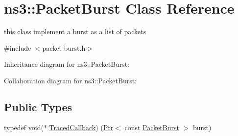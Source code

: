 \hypertarget{classns3_1_1PacketBurst}{}\section{ns3\+:\+:Packet\+Burst Class Reference}
\label{classns3_1_1PacketBurst}


this class implement a burst as a list of packets  




{\ttfamily \#include $<$packet-\/burst.\+h$>$}



Inheritance diagram for ns3\+:\+:Packet\+Burst\+:


Collaboration diagram for ns3\+:\+:Packet\+Burst\+:
\subsection*{Public Types}
\begin{DoxyCompactItemize}
\item 
typedef void($\ast$ \hyperlink{classns3_1_1PacketBurst_ae732b1da721fb013aa92c436f1fea183}{Traced\+Callback}) (\hyperlink{classns3_1_1Ptr}{Ptr}$<$ const \hyperlink{classns3_1_1PacketBurst}{Packet\+Burst} $>$ burst)
\end{DoxyCompactItemize}

